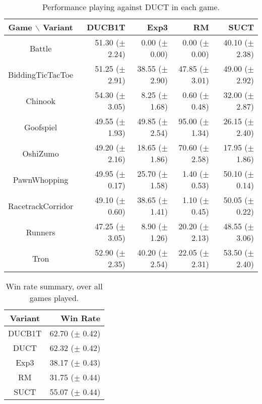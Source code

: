 \documentclass{article}
\begin{document}
\begin{table}
\begin{center}
\begin{tabular}{|c|rrrr|}
\hline
 Game $\backslash$ Variant    & DUCB1T &  Exp3		 & RM		 & SUCT		\\ 
\hline
                   Battle     & 51.30 ($\pm$ 2.24)      & 0.00 ($\pm$ 0.00)     & 0.00 ($\pm$ 0.00)     & 40.10 ($\pm$ 2.38)    \\
         BiddingTicTacToe     & 51.25 ($\pm$ 2.91)      & 38.55 ($\pm$ 2.90)    & 47.85 ($\pm$ 3.01)    & 49.00 ($\pm$ 2.92)    \\
                  Chinook     & 54.30 ($\pm$ 3.05)      & 8.25 ($\pm$ 1.68)     & 0.60 ($\pm$ 0.48)     & 32.00 ($\pm$ 2.87)    \\
                Goofspiel     & 49.55 ($\pm$ 1.93)      & 49.85 ($\pm$ 2.54)    & 95.00 ($\pm$ 1.34)    & 26.15 ($\pm$ 2.40)    \\
                 OshiZumo     & 49.20 ($\pm$ 2.16)      & 18.65 ($\pm$ 1.86)    & 70.60 ($\pm$ 2.58)    & 17.95 ($\pm$ 1.86)    \\
             PawnWhopping     & 49.95 ($\pm$ 0.17)      & 25.70 ($\pm$ 1.58)    & 1.40 ($\pm$ 0.53)     & 50.10 ($\pm$ 0.14)    \\
        RacetrackCorridor     & 49.10 ($\pm$ 0.60)      & 38.65 ($\pm$ 1.41)    & 1.10 ($\pm$ 0.45)     & 50.05 ($\pm$ 0.22)    \\
                  Runners     & 47.25 ($\pm$ 3.05)      & 8.90 ($\pm$ 1.26)     & 20.20 ($\pm$ 2.13)    & 48.55 ($\pm$ 3.06)    \\
                     Tron     & 52.90 ($\pm$ 2.35)      & 40.20 ($\pm$ 2.54)    & 22.05 ($\pm$ 2.31)    & 53.50 ($\pm$ 2.40)    \\
 
\hline
\end{tabular}
\end{center}
\caption{Performance playing against DUCT in each game. \label{tbl:vsduct}}
\end{table}



\begin{table}
\begin{center}
\begin{tabular}{|c|r|}
\hline
Variant     & Win Rate \\
\hline
    DUCB1T  &   62.70 ($\pm$ 0.42) \\
      DUCT  &   62.32 ($\pm$ 0.42) \\
      Exp3  &   38.17 ($\pm$ 0.43) \\
        RM  &   31.75 ($\pm$ 0.44) \\
      SUCT  &   55.07 ($\pm$ 0.44) \\
\hline
\end{tabular}
\end{center}
\caption{Win rate summary, over all games played. \label{tbl:summary}}
\end{table}
\end{document}
